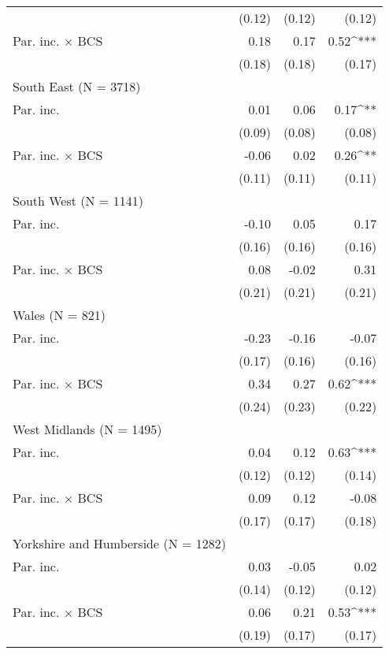 \begin{tabular}{l D{.}{.}{3.5} D{.}{.}{3.5} D{.}{.}{3.5}}
                       & (0.12) & (0.12)      & (0.12)      \\
Par. inc. $\times$ BCS & 0.18   & 0.17        & 0.52^{***}  \\
                       & (0.18) & (0.18)      & (0.17)      \\
\midrule
 South East (N = 3718) & & & \\
\midrule
Par. inc.              & 0.01       & 0.06        & 0.17^{**}   \\
                       & (0.09)     & (0.08)      & (0.08)      \\
Par. inc. $\times$ BCS & -0.06      & 0.02        & 0.26^{**}   \\
                       & (0.11)     & (0.11)      & (0.11)      \\
\midrule
 South West (N = 1141) & & & \\
\midrule
Par. inc.              & -0.10      & 0.05        & 0.17        \\
                       & (0.16)     & (0.16)      & (0.16)      \\
Par. inc. $\times$ BCS & 0.08       & -0.02       & 0.31        \\
                       & (0.21)     & (0.21)      & (0.21)      \\
\midrule
 Wales (N = 821) & & & \\
\midrule
Par. inc.              & -0.23  & -0.16       & -0.07      \\
                       & (0.17) & (0.16)      & (0.16)     \\
Par. inc. $\times$ BCS & 0.34   & 0.27        & 0.62^{***} \\
                       & (0.24) & (0.23)      & (0.22)     \\
\midrule
 West Midlands (N = 1495) & & & \\
\midrule
Par. inc.              & 0.04   & 0.12        & 0.63^{***}  \\
                       & (0.12) & (0.12)      & (0.14)      \\
Par. inc. $\times$ BCS & 0.09   & 0.12        & -0.08       \\
                       & (0.17) & (0.17)      & (0.18)      \\
\midrule
 Yorkshire and Humberside (N = 1282) & & & \\
\midrule
Par. inc.              & 0.03   & -0.05       & 0.02        \\
                       & (0.14) & (0.12)      & (0.12)      \\
Par. inc. $\times$ BCS & 0.06   & 0.21        & 0.53^{***}  \\
                       & (0.19) & (0.17)      & (0.17)      \\
\bottomrule
\end{tabular}
